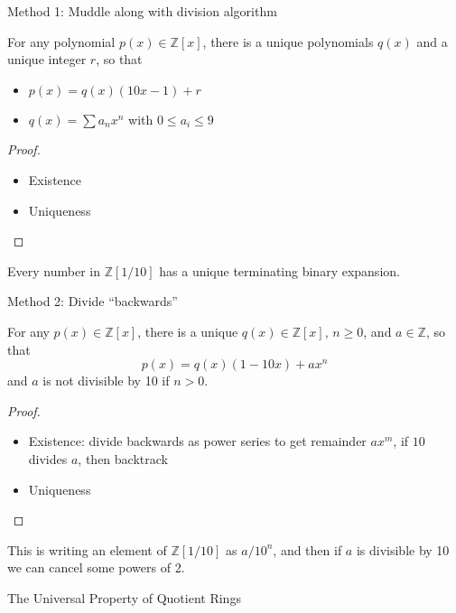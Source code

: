 \documentclass{beamer}
\newcommand{\Z}{\mathbb{Z}}
\begin{document}
\begin{frame}{Method 1: Muddle along with division algorithm}
  \begin{lemma}
    For any polynomial $p(x)\in\Z[x]$, there is a unique polynomials $q(x)$ and a unique integer $r$, so that
    \begin{itemize}
    \item $p(x)=q(x)(10x-1)+r$
    \item $q(x)=\sum a_n x^n$ with $0\leq a_i\leq 9$
    \end{itemize}
  \end{lemma}

  \begin{proof}
    \begin{itemize}
    \item Existence
    \item Uniqueness
\end{itemize}
    \end{proof}

 Every number in $\Z[1/10]$ has a unique terminating binary expansion.


  \end{frame}

\begin{frame}{Method 2: Divide ``backwards''}

  \begin{lemma} For any $p(x)\in\Z[x]$, there is a unique $q(x)\in\Z[x]$, $n\geq 0$, and $a\in\Z$, so that
    $$p(x)=q(x)(1-10x)+ax^n$$
and $a$ is not divisible by 10 if $n>0$.  
  \end{lemma}
  \begin{proof}
    \begin{itemize}
    \item Existence: divide backwards as power series to get remainder $ax^m$, if $10$ divides $a$, then backtrack
    \item Uniqueness
    \end{itemize}
  \end{proof}

  This is writing an element of $\Z[1/10]$ as $a/10^n$, and then if $a$ is divisible by 10 we can cancel some powers of 2.
    \end{frame}

\begin{frame}[plain,c]

\begin{center}

\Huge 

The Universal Property of Quotient Rings
\end{center}

\end{frame}
\end{document}
